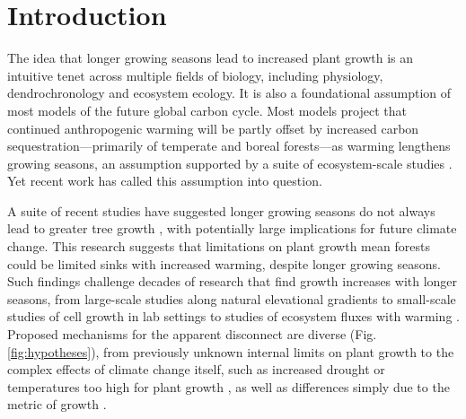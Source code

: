 \documentclass[11pt]{article}
\begin{document}
\section*{Introduction} %

The idea that longer growing seasons lead to increased plant growth is an intuitive tenet across multiple fields of biology, including physiology, dendrochronology\citep{frank2022dendrochronology} and ecosystem ecology. It is also a foundational assumption of most models of the future global carbon cycle\citep[e.g.][]{friedlingstein2022global, ito2020global}. Most models project that continued anthropogenic warming will be partly offset by increased carbon sequestration---primarily of temperate and boreal forests---as warming lengthens growing seasons, an assumption supported by a suite of ecosystem-scale studies \citep{chen1999effects,keenan2014net,finzi2020}. Yet recent work has called this assumption into question.

A suite of recent studies have suggested longer growing seasons do not always lead to greater tree growth \citep{dow2022warm,green2022limits,silvestro2023longer}, with potentially large implications for future climate change. This research suggests that limitations on plant growth mean forests could be limited sinks with increased warming, despite longer growing seasons. Such findings challenge decades of research that find growth increases with longer seasons, from large-scale studies along natural elevational gradients to small-scale studies of cell growth in lab settings to studies of ecosystem fluxes with warming \citep{chen1999effects,keenan2014net,finzi2020}. Proposed mechanisms for the apparent disconnect are diverse (Fig. \ref{fig:hypotheses}), from previously unknown internal limits on plant growth \citep{zohner2023effect} to the complex effects of climate change itself, such as increased drought or temperatures too high for plant growth \citep{dow2022warm}, as well as differences simply due to the metric of growth \citep{green2022limits}.
\end{document}
